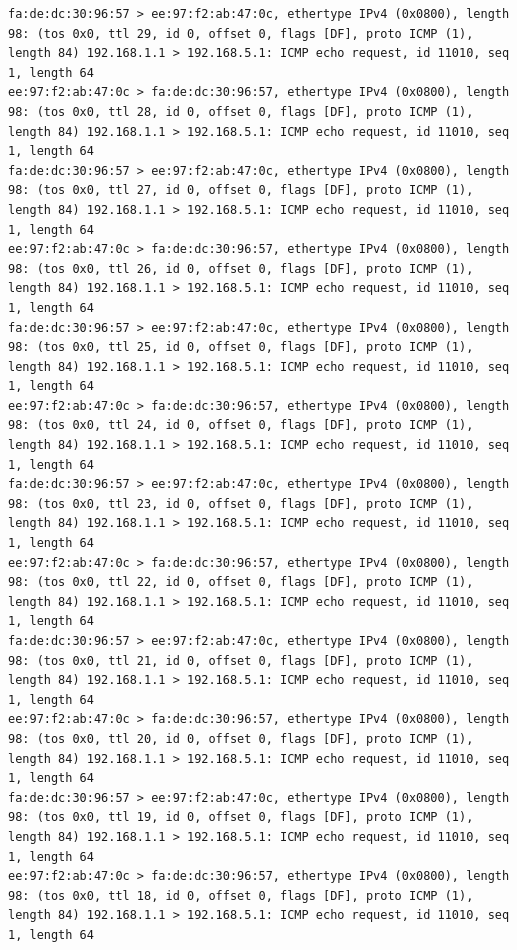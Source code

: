 \documentclass[a4paper,12pt]{article}
\begin{document}
\begin{Verbatim}
fa:de:dc:30:96:57 > ee:97:f2:ab:47:0c, ethertype IPv4 (0x0800), length 98: (tos 0x0, ttl 29, id 0, offset 0, flags [DF], proto ICMP (1), length 84) 192.168.1.1 > 192.168.5.1: ICMP echo request, id 11010, seq 1, length 64
ee:97:f2:ab:47:0c > fa:de:dc:30:96:57, ethertype IPv4 (0x0800), length 98: (tos 0x0, ttl 28, id 0, offset 0, flags [DF], proto ICMP (1), length 84) 192.168.1.1 > 192.168.5.1: ICMP echo request, id 11010, seq 1, length 64
fa:de:dc:30:96:57 > ee:97:f2:ab:47:0c, ethertype IPv4 (0x0800), length 98: (tos 0x0, ttl 27, id 0, offset 0, flags [DF], proto ICMP (1), length 84) 192.168.1.1 > 192.168.5.1: ICMP echo request, id 11010, seq 1, length 64
ee:97:f2:ab:47:0c > fa:de:dc:30:96:57, ethertype IPv4 (0x0800), length 98: (tos 0x0, ttl 26, id 0, offset 0, flags [DF], proto ICMP (1), length 84) 192.168.1.1 > 192.168.5.1: ICMP echo request, id 11010, seq 1, length 64
fa:de:dc:30:96:57 > ee:97:f2:ab:47:0c, ethertype IPv4 (0x0800), length 98: (tos 0x0, ttl 25, id 0, offset 0, flags [DF], proto ICMP (1), length 84) 192.168.1.1 > 192.168.5.1: ICMP echo request, id 11010, seq 1, length 64
ee:97:f2:ab:47:0c > fa:de:dc:30:96:57, ethertype IPv4 (0x0800), length 98: (tos 0x0, ttl 24, id 0, offset 0, flags [DF], proto ICMP (1), length 84) 192.168.1.1 > 192.168.5.1: ICMP echo request, id 11010, seq 1, length 64
fa:de:dc:30:96:57 > ee:97:f2:ab:47:0c, ethertype IPv4 (0x0800), length 98: (tos 0x0, ttl 23, id 0, offset 0, flags [DF], proto ICMP (1), length 84) 192.168.1.1 > 192.168.5.1: ICMP echo request, id 11010, seq 1, length 64
ee:97:f2:ab:47:0c > fa:de:dc:30:96:57, ethertype IPv4 (0x0800), length 98: (tos 0x0, ttl 22, id 0, offset 0, flags [DF], proto ICMP (1), length 84) 192.168.1.1 > 192.168.5.1: ICMP echo request, id 11010, seq 1, length 64
fa:de:dc:30:96:57 > ee:97:f2:ab:47:0c, ethertype IPv4 (0x0800), length 98: (tos 0x0, ttl 21, id 0, offset 0, flags [DF], proto ICMP (1), length 84) 192.168.1.1 > 192.168.5.1: ICMP echo request, id 11010, seq 1, length 64
ee:97:f2:ab:47:0c > fa:de:dc:30:96:57, ethertype IPv4 (0x0800), length 98: (tos 0x0, ttl 20, id 0, offset 0, flags [DF], proto ICMP (1), length 84) 192.168.1.1 > 192.168.5.1: ICMP echo request, id 11010, seq 1, length 64
fa:de:dc:30:96:57 > ee:97:f2:ab:47:0c, ethertype IPv4 (0x0800), length 98: (tos 0x0, ttl 19, id 0, offset 0, flags [DF], proto ICMP (1), length 84) 192.168.1.1 > 192.168.5.1: ICMP echo request, id 11010, seq 1, length 64
ee:97:f2:ab:47:0c > fa:de:dc:30:96:57, ethertype IPv4 (0x0800), length 98: (tos 0x0, ttl 18, id 0, offset 0, flags [DF], proto ICMP (1), length 84) 192.168.1.1 > 192.168.5.1: ICMP echo request, id 11010, seq 1, length 64

\end{Verbatim}
\end{document}
